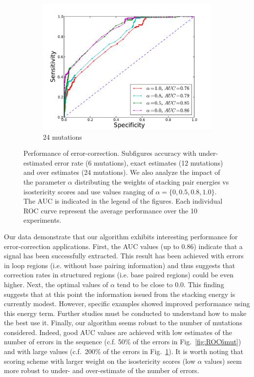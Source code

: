 \begin{figure}
\begin{subfigure}[b]{0.3\textwidth}
\includegraphics[width=1.2\textwidth]{figures/ROC_24.pdf}
\caption{24 mutations}
\label{fig:ROC24mut}
\end{subfigure}
\caption{Performance of error-correction. Subfigures accuracy with under-estimated error rate (6 mutations), exact estimates (12 mutations) and over estimates 
(24 mutations). We also analyze the impact of the parameter $\alpha$ distributing the weights of stacking pair energies vs isostericity scores and use values 
ranging of $\alpha=\{0,0.5,0.8,1.0\}$. The AUC is indicated in the legend of the figures. Each individual ROC curve represent the average performance over the 10 experiments.}
\label{fig:ROCall}
\end{figure}

Our data demonstrate that our algorithm exhibits interesting performance for error-correction applications. First, the AUC values (up to $0.86$) indicate that a
signal has been successfully extracted. This result has been achieved with errors in loop regions (i.e. without base pairing information) and thus suggests
that correction rates in structured regions (i.e. base paired regions) could be even higher. Next, the optimal values of $\alpha$ tend to be close to $0.0$. This 
finding suggests that at this point the information issued from the stacking energy is currently modest. However, specific examples showed improved performance
using this energy term. Further studies must be conducted to understand how to make the best use it. Finally, our algorithm seems robust to the number of
mutations considered. Indeed, good AUC values are achieved with low estimates of the number of errors in the sequence (c.f. 50\% of the errors  in
Fig.~\ref{fig:ROC6mut}) and with large  values (c.f.~200\% of the errors  in Fig.~\ref{fig:ROC24mut}). It is worth noting that scoring scheme with larger weight on
the isostericity scores (low $\alpha$ values) seem more robust to under- and over-estimate of the number of errors.




